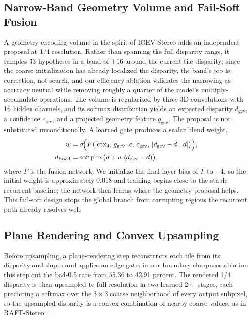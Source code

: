 \documentclass[conference]{IEEEtran}
\begin{document}
\subsection{Narrow-Band Geometry Volume and Fail-Soft Fusion}
A geometry encoding volume in the spirit of IGEV-Stereo \cite{xu2023igev} adds an independent proposal at 1/4 resolution. Rather than spanning the full disparity range, it samples 33 hypotheses in a band of $\pm 16$ around the current tile disparity; since the coarse initialization has already localized the disparity, the band's job is correction, not search, and our efficiency ablation validates the narrowing as accuracy neutral while removing roughly a quarter of the model's multiply-accumulate operations. The volume is regularized by three 3D convolutions with 16 hidden channels, and its softmax distribution yields an expected disparity $d_{\mathrm{gev}}$, a confidence $c_{\mathrm{gev}}$, and a projected geometry feature $g_{\mathrm{gev}}$. The proposal is not substituted unconditionally. A learned gate produces a scalar blend weight,
\begin{equation}
\begin{aligned}
w &= \sigma\!\Bigl(F\bigl([\mathrm{ctx}_{4},\, g_{\mathrm{gev}},\, c,\,
  c_{\mathrm{gev}},\, \lvert d_{\mathrm{gev}} - d \rvert,\, d]\bigr)\Bigr),\\
d_{\mathrm{fused}} &= \mathrm{softplus}\bigl(d + w\,(d_{\mathrm{gev}} - d)\bigr),
\end{aligned}
\label{eq:failsoft}
\end{equation}
where $F$ is the fusion network. We initialize the final-layer bias of $F$ to $-4$, so the initial weight is approximately 0.018 and training begins close to the stable recurrent baseline; the network then learns where the geometry proposal helps. This fail-soft design stops the global branch from corrupting regions the recurrent path already resolves well.

\subsection{Plane Rendering and Convex Upsampling}
Before upsampling, a plane-rendering step reconstructs each tile from its disparity and slopes and applies an edge gate; in our boundary-sharpness ablation this step cut the bad-0.5 rate from 55.36 to 42.91 percent. The rendered 1/4 disparity is then upsampled to full resolution in two learned $2\times$ stages, each predicting a softmax over the $3\times 3$ coarse neighborhood of every output subpixel, so the upsampled disparity is a convex combination of nearby coarse values, as in RAFT-Stereo \cite{lipson2021raftstereo}.
\end{document}
